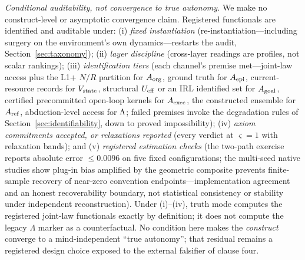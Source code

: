 \emph{Conditional auditability, not convergence to true autonomy.} We make no
construct-level or asymptotic convergence claim. Registered functionals are
identified and auditable under: (i) \emph{fixed instantiation}
(re-instantiation---including surgery on the environment's own
dynamics---restarts the audit, Section~\ref{sec:taxonomy}); (ii) \emph{layer
discipline} (cross-layer readings are profiles, not scalar rankings); (iii)
\emph{identification tiers} (each channel's premise met---joint-law access
plus the L1+ $N/R$ partition for $A_{\mathrm{org}}$, ground truth for $A_{\mathrm{epi}}$,
current-resource records for $V_{\mathrm{state}}$, structural $U_{\mathrm{eff}}$ or an IRL identified
set for $A_{\mathrm{goal}}$, certified precommitted open-loop kernels for $A_{\mathrm{exec}}$, the
constructed ensemble for $A_{\mathrm{ref}}$, abduction-level access for $\Lambda$; failed
premises invoke the degradation rules of
Section~\ref{sec:identifiability}, down to proved impossibility); (iv)
\emph{axiom commitments accepted, or relaxations reported} (every verdict at
$\varsigma=1$ with relaxation bands); and (v) \emph{registered estimation
checks} (the two-path exercise reports absolute error $\le0.0096$ on five
fixed configurations; the multi-seed native studies show plug-in bias
amplified by the geometric composite prevents finite-sample recovery of
near-zero convention endpoints---implementation agreement and an honest
recoverability boundary, not statistical consistency or stability under
independent reconstruction). Under (i)--(iv), truth mode computes the
registered joint-law functionals exactly by definition; it does not compute
the legacy $\Lambda$ marker as a counterfactual. No condition here makes the
\emph{construct} converge to a mind-independent ``true autonomy''; that
residual remains a registered design choice exposed to the external falsifier
of clause four.

